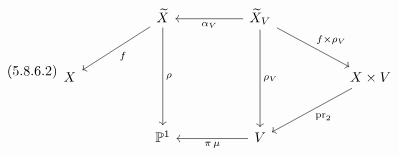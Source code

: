 \begin{equation}\tag{5.8.6.2}
\begin{tikzcd}[column sep=huge, row sep=large]
 {} & \widetilde{X} \arrow[dl, "f"] \arrow[dd, "\rho"] & \widetilde{X}_V \arrow[l, "\alpha_V"] \arrow[dd, "\rho_V"] \arrow[dr, "f\times\rho_V"] & {} \\
X & {} & {} & X\times V \arrow[dl, "\mathrm{pr}_2"] \\
 {} & \mathbb{P}^1 & V \arrow[l, "{\pi\,\mu}"] &
{} \end{tikzcd}
\end{equation}


